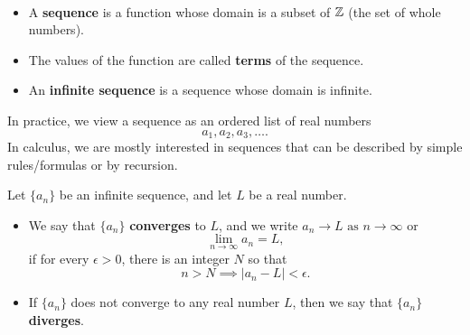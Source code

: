 

\begin{definition}\,
\begin{itemize}
\item A \textbf{sequence} is a function whose domain is a subset of $\mathbb Z$ (the set of whole numbers).
\item The values of the function are called \textbf{terms} of the sequence.
\item An \textbf{infinite sequence} is a sequence whose domain is infinite.
\end{itemize}
\end{definition}

\begin{remark}
In practice, we view a sequence as an ordered list of real numbers
\begin{equation*}
a_1, a_2, a_3,\dots.
\end{equation*}
In calculus, we are mostly interested in sequences that can be described by simple rules/formulas or by recursion.
\end{remark}

\begin{definition}
Let $\{a_n\}$ be an infinite sequence, and let $L$ be a real number.
\begin{itemize}
\item We say that $\{a_n\}$ \textbf{converges} to $L$, and we write $a_n\to L \text{ as } n\to\infty$ or
\begin{equation*}
\lim_{n\to\infty}a_n = L,
\end{equation*}
if for every $\epsilon>0$, there is an integer $N$ so that
\begin{equation*}
n>N \implies |a_n - L|<\epsilon.
\end{equation*}
\item If $\{a_n\}$ does not converge to any real number $L$, then we say that $\{a_n\}$ \textbf{diverges}.
\end{itemize}
\end{definition}

